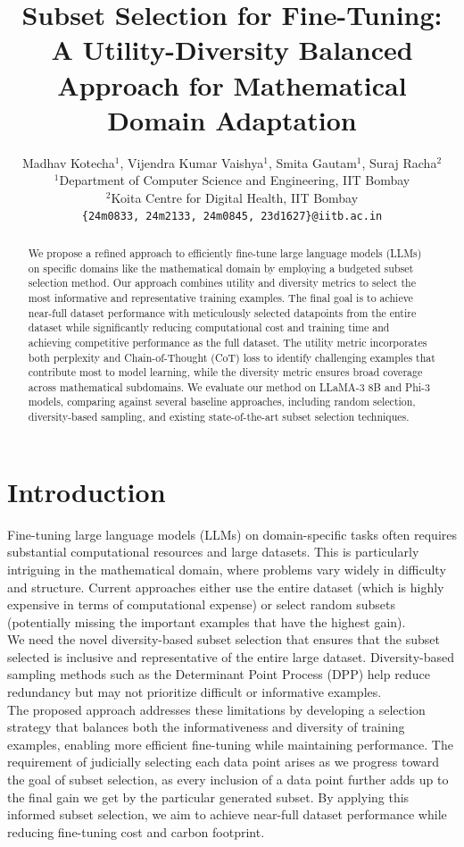 \documentclass{article}
\title{Subset Selection for Fine-Tuning: A Utility-Diversity Balanced Approach for Mathematical Domain Adaptation}
\author{
  Madhav Kotecha${^1}$, Vijendra Kumar Vaishya${^1}$, Smita Gautam${^1}$, Suraj Racha${^2}$ \\
  ${^1}$Department of Computer Science and Engineering, IIT Bombay\\
  ${^2}$Koita Centre for Digital Health, IIT Bombay\\
  \texttt{\{24m0833, 24m2133, 24m0845, 23d1627\}@iitb.ac.in}
}
\begin{document}
\maketitle

\begin{abstract}
We propose a refined approach to efficiently fine-tune large language models (LLMs) on specific domains like the mathematical domain by employing a budgeted subset selection method. Our approach combines utility and diversity metrics to select the most informative and representative training examples. The final goal is to achieve near-full dataset performance with meticulously selected datapoints from the entire dataset while significantly reducing computational cost and training time and achieving competitive performance as the full dataset. The utility metric incorporates both perplexity and Chain-of-Thought (CoT) loss to identify challenging examples that contribute most to model learning, while the diversity metric ensures broad coverage across mathematical subdomains. We evaluate our method on LLaMA-3 8B and Phi-3 models, comparing against several baseline approaches, including random selection, diversity-based sampling, and existing state-of-the-art subset selection techniques.
\end{abstract}

\section{Introduction}

Fine-tuning large language models (LLMs) on domain-specific tasks often requires substantial computational resources and large datasets. This is particularly intriguing in the mathematical domain, where problems vary widely in difficulty and structure. Current approaches either use the entire dataset (which is highly expensive in terms of computational expense) or select random subsets (potentially missing the important examples that have the highest gain). \\ 

We need the novel diversity-based subset selection that ensures that the subset selected is inclusive and representative of the entire large dataset. Diversity-based sampling methods such as the Determinant Point Process (DPP) help reduce redundancy but may not prioritize difficult or informative examples. \\

The proposed approach addresses these limitations by developing a selection strategy that balances both the informativeness and diversity of training examples, enabling more efficient fine-tuning while maintaining performance. The requirement of judicially selecting each data point arises as we progress toward the goal of subset selection, as every inclusion of a data point further adds up to the final gain we get by the particular generated subset. By applying this informed subset selection, we aim to achieve near-full dataset performance while reducing fine-tuning cost and carbon footprint. \\
\end{document}
